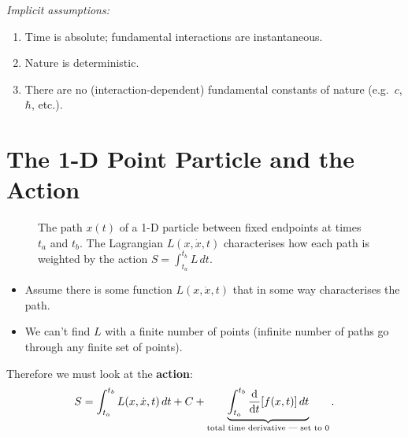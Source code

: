 \textit{Implicit assumptions:}
\begin{enumerate}
    \item[(a)] Time is absolute; fundamental interactions are instantaneous.
    \item[(b)] Nature is deterministic.
    \item[(c)] There are no (interaction-dependent) fundamental constants of nature
        (e.g.\ $c$, $\hbar$, etc.).
\end{enumerate}

\section{The 1-D Point Particle and the Action}

\begin{figure}[H]
\begin{center}
\end{center}
\caption{The path $x(t)$ of a 1-D particle between fixed endpoints at times $t_a$ and $t_b$. The Lagrangian $L(x,\dot{x},t)$ characterises how each path is weighted by the action $S = \int_{t_a}^{t_b} L\,dt$.}
\label{fig:1d_path}
\end{figure}

\begin{itemize}
    \item Assume there is some function $L(x, \dot{x}, t)$ that in some way
        characterises the path.
    \item We can't find $L$ with a finite number of points (infinite number of paths
        go through any finite set of points).
\end{itemize}

Therefore we must look at the \textbf{action}:
\[
    S = \int_{t_a}^{t_b} L(x, \dot{x}, t)\,dt + C
    + \underbrace{\int_{t_a}^{t_b} \dv{t}\!\left[f(x,t)\right]dt}_{\text{total time derivative — set to 0}}.
\]

